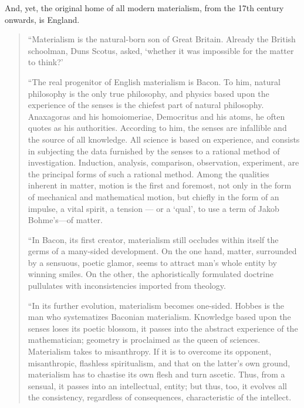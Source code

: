 And, yet, the original home of all modern materialism, from the 17th century
onwards, is England.
%
\begin{quote}
  ``Materialism is the natural-born son of Great Britain. Already the British
  schoolman, Duns Scotus, asked, `whether it was impossible for the matter to
  think?'

  ``The real progenitor of English materialism is Bacon. To him, natural
  philosophy is the only true philosophy, and physics based upon the
  experience of the senses is the chiefest part of natural philosophy.
  Anaxagoras and his homoiomeriae, Democritus and his atoms, he often quotes
  as his authorities. According to him, the senses are infallible and the
  source of all knowledge. All science is based on experience, and consists in
  subjecting the data furnished by the senses to a rational method of
  investigation. Induction, analysis, comparison, observation, experiment, are
  the principal forms of such a rational method. Among the qualities inherent
  in matter, motion is the first and foremost, not only in the form of
  mechanical and mathematical motion, but chiefly in the form of an impulse, a
  vital spirit, a tension — or a `qual', to use a term of Jakob Bohme's---of matter.

  ``In Bacon, its first creator, materialism still occludes within itself the
  germs of a many-sided development. On the one hand, matter, surrounded by a
  sensuous, poetic glamor, seems to attract man's whole entity by winning
  smiles. On the other, the aphoristically formulated doctrine pullulates with
  inconsistencies imported from theology.

  ``In its further evolution, materialism becomes one-sided. Hobbes is the man
  who systematizes Baconian materialism. Knowledge based upon the senses loses
  its poetic blossom, it passes into the abstract experience of the
  mathematician; geometry is proclaimed as the queen of sciences. Materialism
  takes to misanthropy. If it is to overcome its opponent, misanthropic,
  flashless spiritualism, and that on the latter's own ground, materialism has
  to chastise its own flesh and turn ascetic. Thus, from a sensual, it passes
  into an intellectual, entity; but thus, too, it evolves all the consistency,
  regardless of consequences, characteristic of the intellect.


\end{quote}
